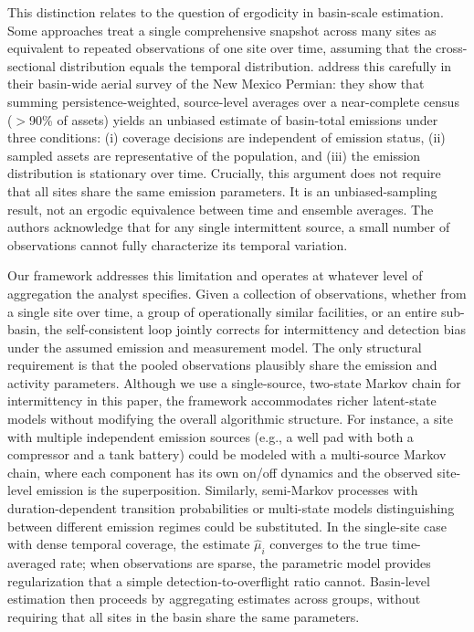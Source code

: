 \documentclass[11pt]{article}
\begin{document}
This distinction relates to the question of ergodicity in basin-scale estimation. Some approaches treat a single comprehensive snapshot across many sites as equivalent to repeated observations of one site over time, assuming that the cross-sectional distribution equals the temporal distribution. \citet{Chen2022EST} address this carefully in their basin-wide aerial survey of the New Mexico Permian: they show that summing persistence-weighted, source-level averages over a near-complete census ($>$90\% of assets) yields an unbiased estimate of basin-total emissions under three conditions: (i) coverage decisions are independent of emission status, (ii) sampled assets are representative of the population, and (iii) the emission distribution is stationary over time. Crucially, this argument does not require that all sites share the same emission parameters. It is an unbiased-sampling result, not an ergodic equivalence between time and ensemble averages. The authors acknowledge that for any single intermittent source, a small number of observations cannot fully characterize its temporal variation.

Our framework addresses this limitation and operates at whatever level of aggregation the analyst specifies. Given a collection of observations, whether from a single site over time, a group of operationally similar facilities, or an entire sub-basin, the self-consistent loop jointly corrects for intermittency and detection bias under the assumed emission and measurement model. The only structural requirement is that the pooled observations plausibly share the emission and activity parameters. Although we use a single-source, two-state Markov chain for intermittency in this paper, the framework accommodates richer latent-state models without modifying the overall algorithmic structure. For instance, a site with multiple independent emission sources (e.g., a well pad with both a compressor and a tank battery) could be modeled with a multi-source Markov chain, where each component has its own on/off dynamics and the observed site-level emission is the superposition. Similarly, semi-Markov processes with duration-dependent transition probabilities or multi-state models distinguishing between different emission regimes could be substituted. In the single-site case with dense temporal coverage, the estimate $\hat{\mu}_i$ converges to the true time-averaged rate; when observations are sparse, the parametric model provides regularization that a simple detection-to-overflight ratio cannot. Basin-level estimation then proceeds by aggregating estimates across groups, without requiring that all sites in the basin share the same parameters.
\end{document}
